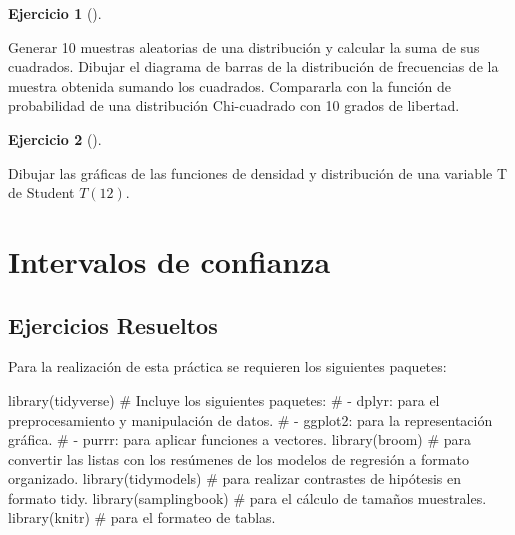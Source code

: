 \documentclass[
  a4paper,
]{scrreport}
\newenvironment{Shaded}{\begin{snugshade}}{\end{snugshade}}
\newcommand{\CommentTok}[1]{\textcolor[rgb]{0.37,0.37,0.37}{#1}}
\newcommand{\FunctionTok}[1]{\textcolor[rgb]{0.28,0.35,0.67}{#1}}
\newcommand{\NormalTok}[1]{\textcolor[rgb]{0.00,0.23,0.31}{#1}}
\theoremstyle{definition}
\newtheorem{exercise}{Ejercicio}[chapter]
\theoremstyle{remark}
\begin{document}
\begin{exercise}[]\protect\hypertarget{exr-distribuciones-probabilidad-10}{}\label{exr-distribuciones-probabilidad-10}

Generar 10 muestras aleatorias de una distribución y calcular la suma de
sus cuadrados. Dibujar el diagrama de barras de la distribución de
frecuencias de la muestra obtenida sumando los cuadrados. Compararla con
la función de probabilidad de una distribución Chi-cuadrado con 10
grados de libertad.

\end{exercise}

\begin{exercise}[]\protect\hypertarget{exr-distribuciones-probabilidad-11}{}\label{exr-distribuciones-probabilidad-11}

Dibujar las gráficas de las funciones de densidad y distribución de una
variable T de Student \(T(12)\).

\end{exercise}


\chapter{Intervalos de confianza}\label{intervalos-de-confianza}

\section{Ejercicios Resueltos}\label{ejercicios-resueltos-6}

Para la realización de esta práctica se requieren los siguientes
paquetes:

\begin{Shaded}
\begin{Highlighting}[]
\FunctionTok{library}\NormalTok{(tidyverse)}
\CommentTok{\# Incluye los siguientes paquetes:}
\CommentTok{\# {-} dplyr: para el preprocesamiento y manipulación de datos.}
\CommentTok{\# {-} ggplot2: para la representación gráfica.}
\CommentTok{\# {-} purrr: para aplicar funciones a vectores.}
\FunctionTok{library}\NormalTok{(broom) }\CommentTok{\# para convertir las listas con los resúmenes de los modelos de regresión a formato organizado.}
\FunctionTok{library}\NormalTok{(tidymodels) }\CommentTok{\# para realizar contrastes de hipótesis en formato tidy.}
\FunctionTok{library}\NormalTok{(samplingbook) }\CommentTok{\# para el cálculo de tamaños muestrales.}
\FunctionTok{library}\NormalTok{(knitr) }\CommentTok{\# para el formateo de tablas.}
\end{Highlighting}
\end{Shaded}
\end{document}
